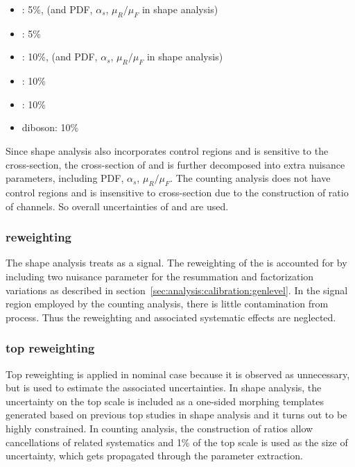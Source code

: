\begin{itemize}
    \item \ttbar: 5\%, (and PDF, $\alpha_{s}$, $\mu_{R}/\mu_{F}$ in shape analysis)
    \item \tW:    5\%
    \item \zjets: 10\%, (and PDF, $\alpha_{s}$, $\mu_{R}/\mu_{F}$ in shape analysis)
    \item \wjets: 10\%
    \item \gjets: 10\%
    \item diboson: 10\%
\end{itemize}
Since shape analysis also incorporates \zjets control regions and is sensitive to the \ttbar cross-section, the cross-section of \zjets and \ttbar is further decomposed into extra nuisance parameters, including PDF, $\alpha_{s}$, $\mu_{R}/\mu_{F}$. The counting analysis does not have \zjets control regions and is insensitive to \ttbar cross-section due to the construction of ratio of channels. So overall uncertainties of \ttbar and \zjets are used.

\subsubsection{\WW \pt reweighting}
The shape analysis treats \WW as a signal. The reweighting of the \WW \pt is accounted for by including two nuisance parameter for the resummation and factorization variations as described in section~\ref{sec:analysis:calibration:genlevel}. In the \ttbar signal region employed by the counting analysis, there is little contamination from \WW process. Thus the \WW \pt reweighting and associated systematic effects are neglected.

\subsubsection{top \pt reweighting}
Top \pt reweighting is applied in nominal case because it is observed as unnecessary, but is used to estimate the associated uncertainties. In shape analysis, the uncertainty on the top \pt scale is included as a one-sided morphing templates generated based on previous top studies in shape analysis and it turns out to be highly constrained. In counting analysis, the construction of ratios allow cancellations of \ttbar related systematics and 1\% of the top \pt scale is used as the size of uncertainty, which gets propagated through the parameter extraction.


